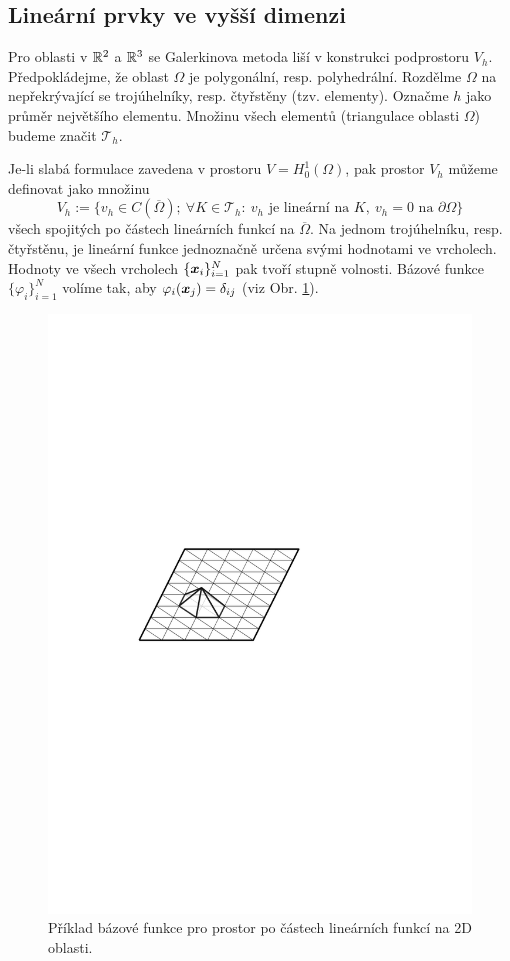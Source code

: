 \subsection{Lineární prvky ve vyšší dimenzi}

Pro oblasti v $\mathbb R^2$ a $\mathbb R^3$ se Galerkinova metoda liší v konstrukci podprostoru $V_h$.
Předpokládejme, že oblast $\Omega$ je polygonální, resp. polyhedrální.
Rozdělme $\Omega$ na nepřekrývající se trojúhelníky, resp. čtyřstěny (tzv. elementy).
Označme $h$ jako průměr největšího elementu.
Množinu všech elementů (triangulace oblasti $\Omega$) budeme značit $\mathcal T_h$.

Je-li slabá formulace zavedena v prostoru $V=H^1_0(\Omega)$, pak prostor $V_h$ můžeme definovat jako množinu
\[ V_h:=\{v_h\in C(\overline\Omega);~\forall K\in\mathcal T_h:~ v_h\mbox{ je lineární na }K,~v_h=0\mbox{ na }\partial\Omega\} \]
všech spojitých po částech lineárních funkcí na $\overline\Omega$.
Na jednom trojúhelníku, resp. čtyřstěnu, je lineární funkce jednoznačně určena svými hodnotami ve vrcholech.
Hodnoty ve všech vrcholech $\{\mathbf{\boldsymbol{x}}_i\}_{i=1}^N$ pak tvoří stupně volnosti.
Bázové funkce $\{\varphi_i\}_{i=1}^N$ volíme tak, aby $\varphi_i(\mathbf{\boldsymbol{x}}_j)=\delta_{ij}$ (viz Obr. \ref{fig:base_2d_lin}).
\begin{figure}[h]
\centering
\includegraphics{base_2d_lin}
\caption{Příklad bázové funkce pro prostor po částech lineárních funkcí na 2D oblasti.}
\label{fig:base_2d_lin}
\end{figure}


